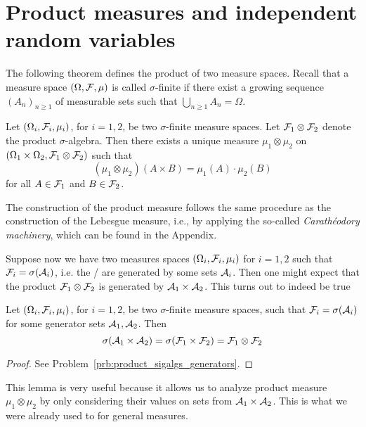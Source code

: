 \section{Product measures and independent random variables}
\label{se:product-measures}

The following theorem defines the product of two measure spaces. Recall that a measure space $(\Omega, \mathcal F, \mu)$ is called $\sigma$-finite if there exist a growing sequence $(A_n)_{n \ge 1}$ of measurable sets such that $\bigcup_{n \ge 1} A_n = \Omega$. 

\begin{theorem}
	\label{th:construction-product-measure}
	Let $(\Omega_i, \mathcal F_i, \mu_i)$, for $i = 1, 2$,  be two $\sigma$-finite measure spaces. Let $\mathcal F_1 \otimes \mathcal F_2$ denote the product $\sigma$-algebra. 
	Then there exists a unique measure $\mu_1 \otimes \mu_2$ on 
	$(\Omega_1 \times \Omega_2, \mathcal F_1 \otimes \mathcal F_2)$ such that 
	\[
	(\mu_1 \otimes \mu_2)(A \times B ) = \mu_1(A) \cdot \mu_2(B)
	\]
	for all $A \in \mathcal F_1$ and $B \in \mathcal F_2$.
\end{theorem}

The construction of the product measure follows the same procedure as the construction of the Lebesgue measure, i.e., by applying the so-called \emph{Carath\'eodory machinery}, which can be found in the Appendix.

Suppose now we have two measures spaces $(\Omega_i, \mathcal F_i, \mu_i)$ for $i = 1,2$ such that $\mathcal F_i = \sigma(\mathcal A_i)$, i.e. the \sigalgs/ are generated by some sets $\mathcal A_i$. Then one might expect that the product $\mathcal F_1 \otimes \mathcal F_2$ is generated by $\mathcal A_1 \times \mathcal A_2$. This turns out to indeed be true

\begin{lemma}\label{lem:product_sigalgs_generators}
Let $(\Omega_i, \mathcal F_i, \mu_i)$, for $i = 1, 2$,  be two $\sigma$-finite measure spaces, such that $\mathcal F_i = \sigma(\mathcal A_i)$ for some generator sets $\mathcal A_1, \mathcal A_2$. Then
\[
	\sigma(\mathcal A_1 \times \mathcal A_2) = \sigma(\mathcal F_1 \times \mathcal F_2) = \mathcal F_1 \otimes \mathcal F_2
\] 
\end{lemma}

\begin{proof}
See Problem~\ref{prb:product_sigalgs_generators}.
\end{proof}

This lemma is very useful because it allows us to analyze product measure $\mu_1 \otimes \mu_2$ by only considering their values on sets from $\mathcal A_1 \times \mathcal A_2$. This is what we were already used to for general measures.

